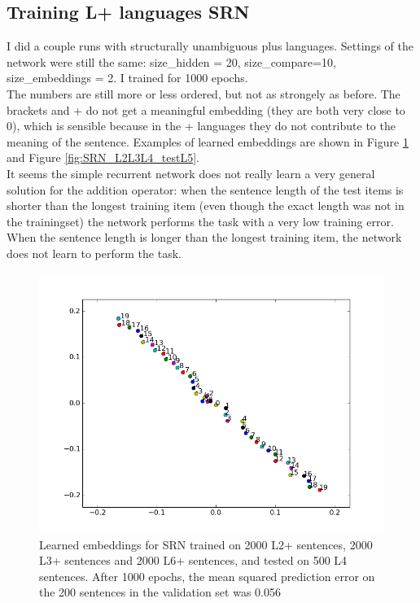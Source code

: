 \documentclass{article}
\begin{document}
\subsection{Training L+ languages SRN}

I did a couple runs with structurally unambiguous plus languages. 
Settings of the network were still the same: size\_hidden = 20, size\_compare=10, size\_embeddings = 2. 
I trained for 1000 epochs.\\

The numbers are still more or less ordered, but not as strongely as before. 
The brackets and + do not get a meaningful embedding (they are both very close to 0), which is sensible because in the + languages they do not contribute to the meaning of the sentence.
Examples of learned embeddings are shown in Figure \ref{fig:SRN_L2L3L6_testL5} and Figure \ref{fig:SRN_L2L3L4_testL5}.\\

It seems the simple recurrent network does not really learn a very general solution for the addition operator: when the sentence length of the test items is shorter than the longest training item (even though the exact length was not in the trainingset) the network performs the task with a very low training error. 
When the sentence length is longer than the longest training item, the network does not learn to perform the task.

\begin{figure}[!ht]
        \includegraphics[scale=0.8]{SRN_L2L3L6.png}
        \caption{Learned embeddings for SRN trained on 2000 L2+ sentences, 2000 L3+ sentences and 2000 L6+ sentences, and tested on 500 L4 sentences. After 1000 epochs, the mean squared prediction error on the 200 sentences in the validation set was 0.056}\label{fig:SRN_L2L3L6_testL5}
\end{figure}
\end{document}
